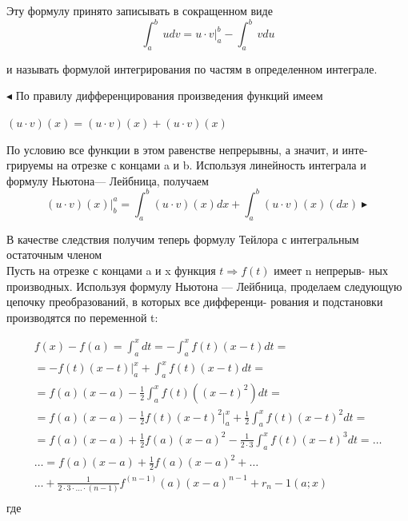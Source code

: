 Эту формулу принято записывать в сокращенном виде
\begin{equation}
	\int_{a}^{b}  \,udv = u \cdot v | _a^b - \int_{a}^{b} \, vdu
\end{equation}

и называть формулой интегрирования по частям в определенном интеграле.

$\blacktriangleleft$ По правилу дифференцирования произведения функций имеем
\begin{center}
	$
	(u \cdot v) (x) = (u \cdot v) (x) + (u \cdot v)(x)
	$
\end{center}
По условию все функции в этом равенстве непрерывны, а значит, и инте-
грируемы на отрезке с концами a и b. Используя линейность интеграла и
формулу Ньютона— Лейбница, получаем
\begin{equation}
	(u \cdot v) (x) |^a_b = \int_{a}^{b}(u \cdot v)(x)dx+\int_{a}^{b}(u \cdot v)(x)(dx) \blacktriangleright
\end{equation}

В качестве следствия получим теперь формулу Тейлора с интегральным
остаточным членом
\\

Пусть на отрезке с концами a и x функция $t \Rightarrow  f (t)$ имеет n непрерыв-
ных производных. Используя формулу Ньютона — Лейбница,
проделаем следующую цепочку преобразований, в которых все дифференци-
рования и подстановки производятся по переменной t:

\begin{multline}
	f(x)-f(a)=\int_{a}^{x}dt = - \int_{a}^{x}f(t)(x-t)dt=\\
	= -f(t)(x-t)|^x_a + \int_{a}^{x}f(t)(x-t)dt =\\
	=f(a)(x-a)-\frac{1}{2}\int_{a}^{x}f(t)((x-t)^2)dt=\\
	=f(a)(x-a)-\frac{1}{2}f(t)(x-t)^2|^x_a+\frac{1}{2}\int^x_a f(t)(x-t)^2dt=\\
	=f(a)(x-a)+\frac{1}{2}f(a)(x-a)^2-\frac{1}{2 \cdot 3} \int^x_a f(t) (x-t)^3 dt = \dots \\
	\dots = f(a)(x-a)+\frac{1}{2}f(a)(x-a)^2 + \dots \\
	\dots + \frac{1}{2 \cdot 3 \cdot  \dots \cdot (n-1) } f^(n-1)(a)(x-a)^{n-1}+r_n-1(a;x) \\
\end{multline}
где

